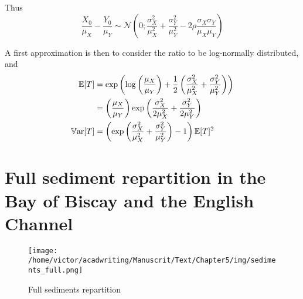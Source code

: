 \documentclass[../../Main_ManuscritThese.tex]{subfiles}
\begin{document}
  Thus
  \begin{equation}
    \frac{X_0}{\mu_X} - \frac{Y_0}{\mu_Y} \sim \mathcal{N}\left(0;\frac{\sigma^2_X}{\mu_X^2} + \frac{\sigma^2_Y}{\mu_Y^2} - 2 \rho \frac{\sigma_X \sigma_Y}{\mu_X \mu_Y} \right)
  \end{equation}
  
  A first approximation is then to consider the ratio to be log-normally distributed, and
  \begin{align}
    \mathbb{E}[T] &= \exp\left(\log\left(\frac{\mu_X}{\mu_Y}\right) + \frac{1}{2}\left(\frac{\sigma_X^2}{\mu_X^2}+\frac{\sigma_Y^2}{\mu_Y^2} \right)\right)\\
           &=\left(\frac{\mu_X}{\mu_Y}\right) \exp\left(\frac{\sigma_X^2}{2\mu_X^2}+\frac{\sigma_Y^2}{2\mu_Y^2}\right) \\
    \mathbb{V}\mathrm{ar}[T] &= \left(\exp\left(\frac{\sigma_X^2}{\mu_X^2}+\frac{\sigma_Y^2}{\mu_Y^2}\right)-1 \right)\mathbb{E}[T]^2
  \end{align}



  \section{Full sediment repartition in the Bay of Biscay and the English Channel}
  \label{sec:sediments_full}
\begin{figure}[ht]
  \centering
  \texttt{[image: /home/victor/acadwriting/Manuscrit/Text/Chapter5/img/sediments\_full.png]}
  \caption{\label{fig:sediments_full} Full sediments repartition}
\end{figure}
\end{document}
